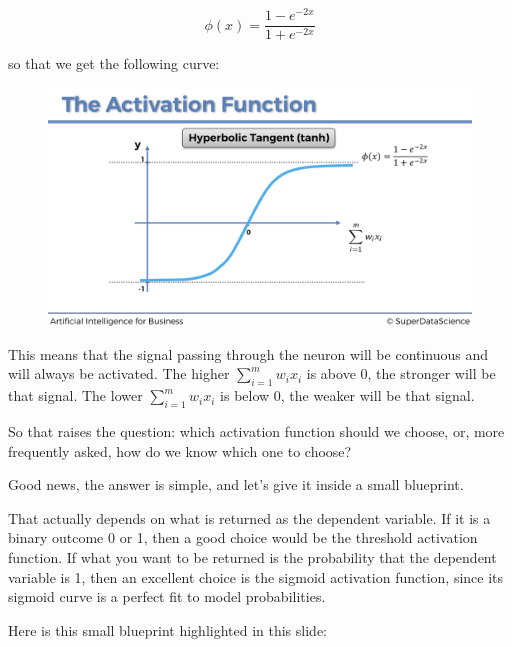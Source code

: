 \documentclass[]{book}
\begin{document}
\begin{equation*}
    \phi(x) = \frac{1-e^{-2x}}{1+e^{-2x}}
\end{equation*}

so that we get the following curve:

\begin{figure}[!htbp]
        \begin{center}
            \includegraphics[scale=0.18]{ANN_13.png}
        \end{center}
\end{figure}

This means that the signal passing through the neuron will be continuous and will always be activated. The higher \(\sum_{i=1}^m w_i x_i\) is above 0, the stronger will be that signal. The lower \(\sum_{i=1}^m w_i x_i\) is below 0, the weaker will be that signal.

\newpage

So that raises the question: which activation function should we choose, or, more frequently asked, how do we know which one to choose?

Good news, the answer is simple, and let's give it inside a small blueprint.

That actually depends on what is returned as the dependent variable. If it is a binary outcome 0 or 1, then a good choice would be the threshold activation function. If what you want to be returned is the probability that the dependent variable is 1, then an excellent choice is the sigmoid activation function, since its sigmoid curve is a perfect fit to model probabilities.

Here is this small blueprint highlighted in this slide:
\end{document}
